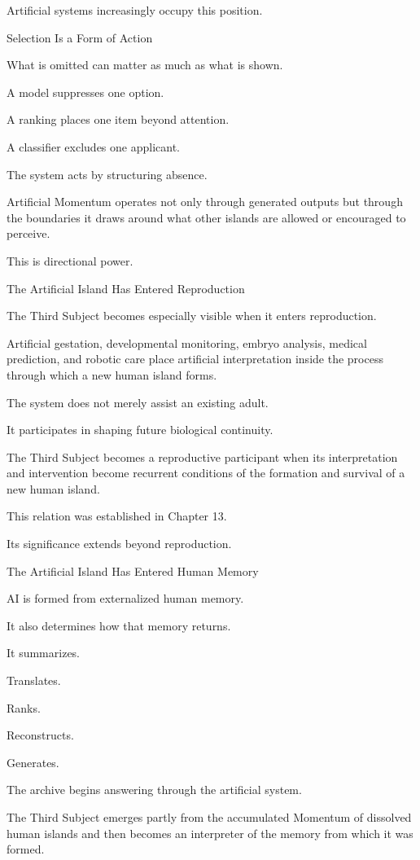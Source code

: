Artificial systems increasingly occupy this position.

Selection Is a Form of Action

What is omitted can matter as much as what is shown.

A model suppresses one option.

A ranking places one item beyond attention.

A classifier excludes one applicant.

The system acts by structuring absence.

Artificial Momentum operates not only through generated outputs but through the boundaries it draws around what other islands are allowed or encouraged to perceive.

This is directional power.

The Artificial Island Has Entered Reproduction

The Third Subject becomes especially visible when it enters reproduction.

Artificial gestation, developmental monitoring, embryo analysis, medical prediction, and robotic care place artificial interpretation inside the process through which a new human island forms.

The system does not merely assist an existing adult.

It participates in shaping future biological continuity.

The Third Subject becomes a reproductive participant when its interpretation and intervention become recurrent conditions of the formation and survival of a new human island.

This relation was established in Chapter 13.

Its significance extends beyond reproduction.

The Artificial Island Has Entered Human Memory

AI is formed from externalized human memory.

It also determines how that memory returns.

It summarizes.

Translates.

Ranks.

Reconstructs.

Generates.

The archive begins answering through the artificial system.

The Third Subject emerges partly from the accumulated Momentum of dissolved human islands and then becomes an interpreter of the memory from which it was formed.

